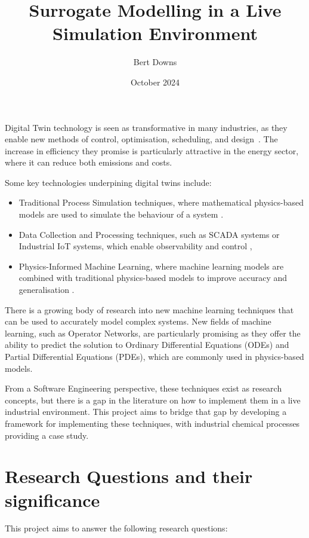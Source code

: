 \documentclass[12pt]{article}
\title{Surrogate Modelling in a Live Simulation Environment}
\author{Bert Downs }
\date{October 2024}
\begin{document}
\maketitle

Digital Twin technology is seen as transformative in many industries, as they enable new methods of control, optimisation, scheduling, and design~\cite{walmsley2024adaptive}. The increase in efficiency they promise is particularly attractive in the energy sector, where it can reduce both emissions and costs.

Some key technologies underpining digital twins include:

\begin{itemize}
    \item Traditional Process Simulation techniques, where mathematical physics-based models are used to simulate the behaviour of a system \cite{lee2021idaes}.
    \item Data Collection and Processing techniques, such as SCADA systems or Industrial IoT systems, which enable observability and control \cite{udugama2020role},
    \item Physics-Informed Machine Learning, where machine learning models are combined with traditional physics-based models to improve accuracy and generalisation \cite{karniadakis2021physics}.
\end{itemize}

There is a growing body of research into new machine learning techniques that can be used to accurately model complex systems. New fields of machine learning, such as Operator Networks, are particularly promising as they offer the ability to predict the solution to Ordinary Differential Equations (ODEs) and Partial Differential Equations (PDEs)\cite{lu2019deeponet}, which are commonly used in physics-based models.

From a Software Engineering perspective, these techniques exist as research concepts, but there is a gap in the literature on how to implement them in a live industrial environment. This project aims to bridge that gap by developing a framework for implementing these techniques, with industrial chemical processes providing a case study.

\section{Research Questions and their significance}

This project aims to answer the following research questions:
\end{document}

